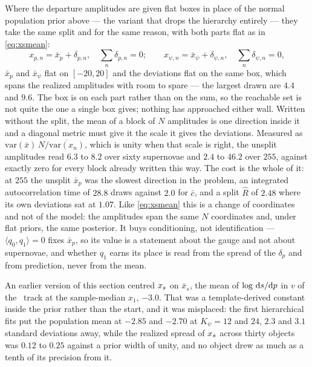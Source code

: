 \documentclass[11pt]{article}
\theoremstyle{plain}
\begin{document}
Where the departure amplitudes are given flat boxes in place of the normal population prior
above --- the variant that drops the hierarchy entirely --- they take the same split and for
the same reason, with both parts flat as in \eqref{eq:xsmean}:
\begin{equation}
  x_{p,n} = \bar x_{p} + \delta_{p,n} , \quad \sum_{n} \delta_{p,n} = 0 ;
  \qquad
  x_{\psi,n} = \bar x_{\psi} + \delta_{\psi,n} , \quad \sum_{n} \delta_{\psi,n} = 0 ,
  \label{eq:ampmean}
\end{equation}
$\bar x_{p}$ and $\bar x_{\psi}$ flat on $[-20, 20]$ and the deviations flat on the same
box, which spans the realized amplitudes with room to spare --- the largest drawn are $4.4$
and $9.6$. The box is on each part rather than on the sum, so the reachable set is not
quite the one a single box gives; nothing has approached either wall. Written without the
split, the mean of a block of $N$ amplitudes is one direction inside it and a diagonal
metric must give it the scale it gives the deviations. Measured as
$\mathrm{var}(\bar x)\,N / \overline{\mathrm{var}(x_{n})}$, which is unity when that
scale is right, the unsplit amplitudes read $6.3$ to $8.2$ over sixty supernovae and $2.4$
to $46.2$ over $255$, against exactly zero for every block already written this way. The
cost is the whole of it: at $255$ the unsplit $\bar x_{p}$ was the slowest direction in the
problem, an integrated autocorrelation time of $28.8$ draws against $2.0$ for $\bar c$, and
a split $\hat{R}$ of $2.48$ where its own deviations sat at $1.07$. Like \eqref{eq:xsmean}
this is a change of coordinates and not of the model: the amplitudes span the same $N$
coordinates and, under flat priors, the same posterior. It buys conditioning, not
identification --- $\langle q_{0}, q_{1}\rangle = 0$ fixes $\bar x_{p}$, so its value is a
statement about the gauge and not about supernovae, and whether $q_{1}$ earns its place is
read from the spread of the $\delta_{p}$ and from prediction, never from the mean.

An earlier version of this section centred $x_{s}$ on $\bar x_{s}$, the mean of
$\log\,\mathrm{d}s/\mathrm{d}p$ in $v$ of the \salt\ track at the sample-median $x_{1}$, $-3.0$.
That was a template-derived constant inside the prior rather than the start, and it was
misplaced: the first hierarchical fits put the population mean at $-2.85$ and $-2.70$ at
$K_{\psi} = 12$ and $24$, $2.3$ and $3.1$ standard deviations away, while the realized
spread of $x_{s}$ across thirty objects was $0.12$ to $0.25$ against a prior width of
unity, and no object drew as much as a tenth of its precision from it.
\end{document}
